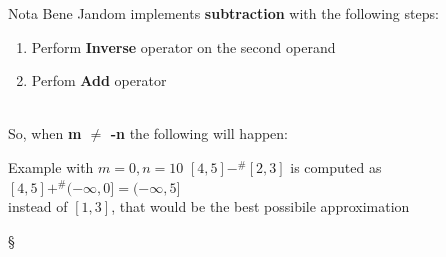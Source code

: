 \documentclass{beamer}
\begin{document}
	\begin{frame}{Nota Bene}
		Jandom implements \textbf{subtraction} with the following steps:
		\begin{enumerate}
			\item Perform \textbf{Inverse} operator on the second operand
			\item Perfom \textbf{Add} operator\\~\\
		\end{enumerate}
		So, when \textbf{m $\neq$ -n} the following will happen:
			\begin{exampleblock}{Example with $m = 0, n = 10$}
				$[4,5] -^\# [2,3]$ is computed as $[4,5] +^\# (-\infty,0] = (-\infty,5]$ \\instead of $[1,3]$, that would be the best possibile approximation
			\end{exampleblock}
	\end{frame}

	\begin{frame}{ § }

	\end{frame}
\end{document}
